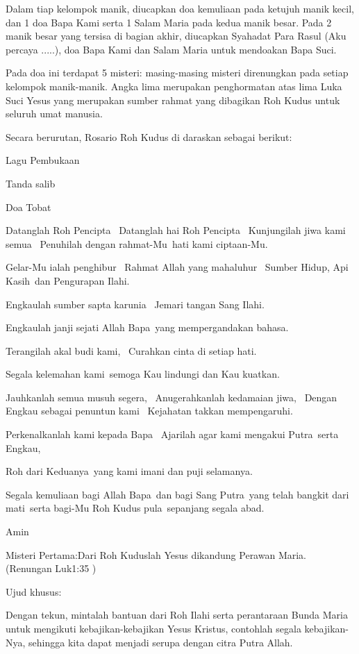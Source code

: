 \documentclass{article}
\begin{document}
Dalam tiap kelompok manik, diucapkan doa kemuliaan pada ketujuh manik
kecil, dan 1 doa Bapa Kami serta 1 Salam Maria pada kedua manik besar.
Pada 2 manik besar yang tersisa di bagian akhir, diucapkan Syahadat
Para Rasul (Aku percaya .....), doa Bapa Kami dan Salam Maria untuk
mendoakan Bapa Suci.

Pada doa ini terdapat 5 misteri: masing-masing misteri direnungkan pada
setiap kelompok manik-manik. Angka lima merupakan penghormatan atas
lima Luka Suci Yesus yang merupakan sumber rahmat yang dibagikan Roh
Kudus untuk seluruh umat manusia.

Secara berurutan, Rosario Roh Kudus di daraskan sebagai berikut:

Lagu Pembukaan

Tanda salib

Doa Tobat

Datanglah Roh Pencipta~ Datanglah hai Roh Pencipta~ Kunjungilah jiwa
kami semua~ Penuhilah dengan rahmat-Mu~hati kami ciptaan-Mu.

Gelar-Mu ialah penghibur~ Rahmat Allah yang mahaluhur~ Sumber Hidup, Api
Kasih~dan Pengurapan Ilahi.

Engkaulah sumber sapta karunia~ Jemari tangan Sang Ilahi.

Engkaulah janji sejati Allah Bapa~yang mempergandakan bahasa.

Terangilah akal budi kami,~ Curahkan cinta di setiap hati.

Segala kelemahan kami~semoga Kau lindungi dan Kau kuatkan.

Jauhkanlah semua musuh segera,~ Anugerahkanlah kedamaian jiwa,~ Dengan
Engkau sebagai penuntun kami~ Kejahatan tak{\textquotesingle}kan
mempengaruhi.

Perkenalkanlah kami kepada Bapa~ Ajarilah agar kami mengakui Putra~serta
Engkau, 

Roh dari Keduanya~yang kami imani dan puji selamanya.

Segala kemuliaan bagi Allah Bapa~dan bagi Sang Putra~yang telah bangkit
dari mati~serta bagi-Mu Roh Kudus pula~sepanjang segala abad.

Amin

Misteri Pertama:{\textquotedbl}Dari Roh Kuduslah Yesus dikandung Perawan
Maria.{\textquotedbl}~ (Renungan Luk1:35 )

Ujud khusus:~

Dengan tekun, mintalah bantuan dari Roh Ilahi serta perantaraan Bunda
Maria untuk mengikuti kebajikan-kebajikan Yesus Kristus, contohlah
segala kebajikan-Nya, sehingga kita dapat menjadi serupa dengan citra
Putra Allah.
\end{document}
